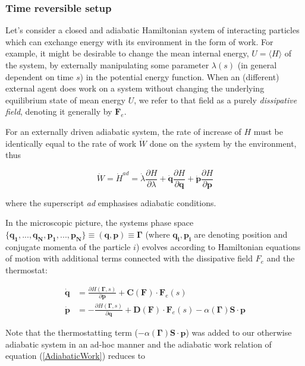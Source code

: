 \documentclass[a4paper,12pt]{article}
\begin{document}
\subsubsection{Time reversible setup}
Let's consider a closed and adiabatic Hamiltonian system of interacting particles which can exchange energy with its environment in the form of work. For example, it might be desirable to change the mean internal energy, $U=\langle H \rangle$ of the system, by externally manipulating some parameter $\lambda(s)$ (in general dependent on time $s$) in the potential energy function. 
When an (different) external agent does work on a system without changing the underlying equilibrium state of mean energy $U$, we refer to that field as a purely \textit{dissipative field}, denoting it generally by $\bm{F}_e$.

For an externally driven adiabatic system, the rate of increase of $H$ must be identically equal to the rate of work $\dot{W}$ done on the system by the environment, thus

\begin{equation}
\label{AdiabaticWork}
  \dot{W} = \dot{H}^{ad} = \dot{\lambda} \frac{\partial{H}}{\partial{\lambda}} +\dot{\bm{q}}\frac{\partial{H}}{\partial{\bm{q}}} +\dot{\bm{p}}\frac{\partial{H}}{\partial{\bm{p}}}
\end{equation}

where the superscript \textit{ad} emphasises adiabatic conditions. 

In the microscopic picture, the systems phase space $\{\bm{q_1},...,\bm{q_N},\bm{p_1},...,\bm{p_N} \} \equiv (\bm{q},\bm{p})\equiv \bm{\Gamma} $ (where $\bm{q_i}, \bm{p_i} $ are denoting position and conjugate momenta of the particle $i$) evolves according to Hamiltonian equations of motion with additional terms connected with the dissipative field $F_e$ and the thermostat:

\begin{equation}
\begin{aligned}
\label{ThermostattedEq}
  \dot{\bm{q}} &=\frac{\partial H(\bm{\Gamma},s)}{\partial{\bm{p}}}+\bm{C}(\bm{F})\cdot\bm{F}_e(s) \\
  \dot{\bm{p}} &=- \frac{\partial H(\bm{\Gamma},s)}{\partial{\bm{q}}}+\bm{D}(\bm{F})\cdot\bm{F}_e(s) - \alpha(\bm{\Gamma})\bm{S}\cdot\bm{p}
\end{aligned}
\end{equation}

Note that the thermostatting term ($- \alpha(\bm{\Gamma})\bm{S}\cdot\bm{p}$) was added to our otherwise adiabatic system in an ad-hoc manner and the adiabatic work relation of equation (\ref{AdiabaticWork}) reduces to
\end{document}
